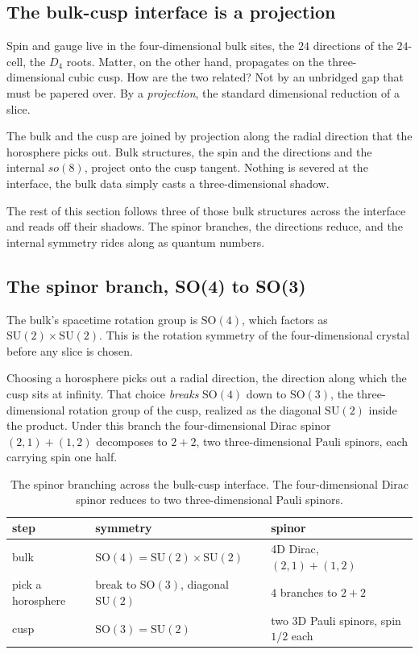 \subsection{The bulk-cusp interface is a projection}

Spin and gauge live in the four-dimensional bulk sites, the $24$ directions of the $24$-cell, the $D_4$ roots. Matter, on the other hand, propagates on the three-dimensional cubic cusp. How are the two related? Not by an unbridged gap that must be papered over. By a \emph{projection}, the standard dimensional reduction of a slice.

\begin{principle}
The bulk and the cusp are joined by projection along the radial direction that the horosphere picks out. Bulk structures, the spin and the directions and the internal $so(8)$, project onto the cusp tangent. Nothing is severed at the interface, the bulk data simply casts a three-dimensional shadow.
\end{principle}

The rest of this section follows three of those bulk structures across the interface and reads off their shadows. The spinor branches, the directions reduce, and the internal symmetry rides along as quantum numbers.

\subsection{The spinor branch, SO(4) to SO(3)}

The bulk's spacetime rotation group is $\mathrm{SO}(4)$, which factors as $\mathrm{SU}(2) \times \mathrm{SU}(2)$. This is the rotation symmetry of the four-dimensional crystal before any slice is chosen.

Choosing a horosphere picks out a radial direction, the direction along which the cusp sits at infinity. That choice \emph{breaks} $\mathrm{SO}(4)$ down to $\mathrm{SO}(3)$, the three-dimensional rotation group of the cusp, realized as the diagonal $\mathrm{SU}(2)$ inside the product. Under this branch the four-dimensional Dirac spinor $(2,1) + (1,2)$ decomposes to $2 + 2$, two three-dimensional Pauli spinors, each carrying spin one half.

\begin{table}[ht]
\centering
\begin{tabular}{@{}lll@{}}
\toprule
step & symmetry & spinor \\
\midrule
bulk & $\mathrm{SO}(4) = \mathrm{SU}(2) \times \mathrm{SU}(2)$ & 4D Dirac, $(2,1) + (1,2)$ \\
pick a horosphere & break to $\mathrm{SO}(3)$, diagonal $\mathrm{SU}(2)$ & $4$ branches to $2 + 2$ \\
cusp & $\mathrm{SO}(3) = \mathrm{SU}(2)$ & two 3D Pauli spinors, spin $1/2$ each \\
\bottomrule
\end{tabular}
\caption{The spinor branching across the bulk-cusp interface. The four-dimensional Dirac spinor reduces to two three-dimensional Pauli spinors.}
\label{tab:spinor-branch}
\end{table}

